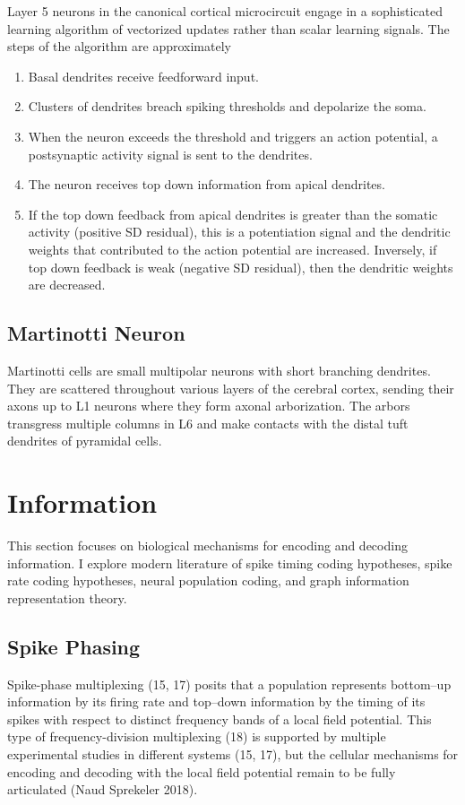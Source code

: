 \documentclass[11pt, a4paper]{article}
\begin{document}
Layer 5 neurons in the canonical cortical microcircuit engage in a sophisticated learning algorithm of vectorized updates rather than scalar learning signals. The steps of the algorithm are approximately
\begin{enumerate}
    \item Basal dendrites receive feedforward input. 
    \item Clusters of dendrites breach spiking thresholds and depolarize the soma.
    \item When the neuron exceeds the threshold and triggers an action potential, a postsynaptic activity signal is sent to the dendrites.
    \item The neuron receives top down information from apical dendrites.
    \item If the top down feedback from apical dendrites is greater than the somatic activity (positive SD residual), this is a potentiation signal and the dendritic weights that contributed to the action potential are increased. Inversely, if top down feedback is weak (negative SD residual), then the dendritic weights are decreased.
\end{enumerate}

\subsection{Martinotti Neuron}
Martinotti cells are small multipolar neurons with short branching dendrites. They are scattered throughout various layers of the cerebral cortex, sending their axons up to L1 neurons where they form axonal arborization. The arbors transgress multiple columns in L6 and make contacts with the distal tuft dendrites of pyramidal cells.



\section{Information}
This section focuses on biological mechanisms for encoding and decoding information. I explore modern literature of spike timing coding hypotheses, spike rate coding hypotheses, neural population coding, and graph information representation theory.

\subsection{Spike Phasing}
Spike-phase multiplexing (15, 17) posits that a population represents bottom–up information by its firing rate and top–down information by the timing of its spikes with respect to distinct frequency bands of a local field potential. This type of frequency-division multiplexing (18) is supported by multiple experimental studies in different systems (15, 17), but the cellular mechanisms for encoding and decoding with the local field potential remain to be fully articulated (Naud Sprekeler 2018).
\end{document}
